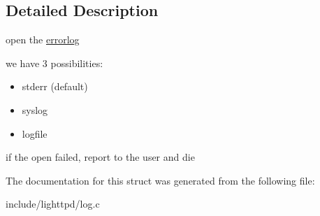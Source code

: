 \begin{CompactItemize}
\begin{CompactItemize}
\end{CompactItemize}


\subsection{Detailed Description}
open the \hyperlink{structerrorlog}{errorlog}

we have 3 possibilities:\begin{itemize}
\item stderr (default)\item syslog\item logfile\end{itemize}


if the open failed, report to the user and die 

The documentation for this struct was generated from the following file:\begin{CompactItemize}
\item 
include/lighttpd/log.c\end{CompactItemize}
